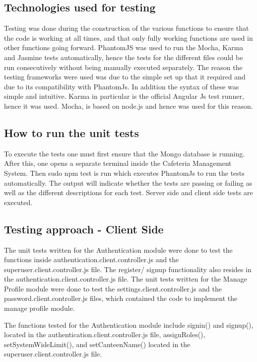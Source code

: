 \documentclass[a4paper,12pt]{report}
\begin{document}
\subsection{Technologies used for testing}
Testing was done during the construction of the various functions to ensure that the code is working at all times, and that only fully working functions are used in other functions going forward. PhantomJS was used to run the Mocha, Karma and Jasmine tests automatically, hence the tests for the different files could be run consecutively without being manually executed separately. The reason the testing frameworks were used was due to the simple set up that it required and due to its compatibility with PhantomJs. In addition the syntax of these was simple and intuitive.  Karma in particular is the official Angular Js test runner, hence it was used. Mocha, is based on node.js and hence was used for this reason. 
\\
\subsection{How to run the unit tests}
To execute the tests one must first ensure that the Mongo database is running. After this, one opens a separate terminal inside the Cafeteria Management System. Then sudo npm test is run which executes PhantomJs to run the tests automatically.  The output will indicate whether the tests are passing or failing as well as the different descriptions for each test. Server side and client side tests are executed.

\subsection{Testing approach - Client Side}
The unit tests written for the Authentication module were done to test the functions inside authentication.client.controller.js and the superuser.client.controller.js file.  The register/ signup functionality also resides in the authentication.client.controller.js file. The unit tests written for the Manage Profile module were done to test the settings.client.controller.js and the password.client.controller.js files, which contained the code to implement the manage profile module.
 
The functions tested for the Authentication module include signin() and signup(), located in the authentication.client.controller.js file, assignRoles(), setSystemWideLimit(), and setCanteenName() located in the  superuser.client.controller.js file.
 
\end{document}
